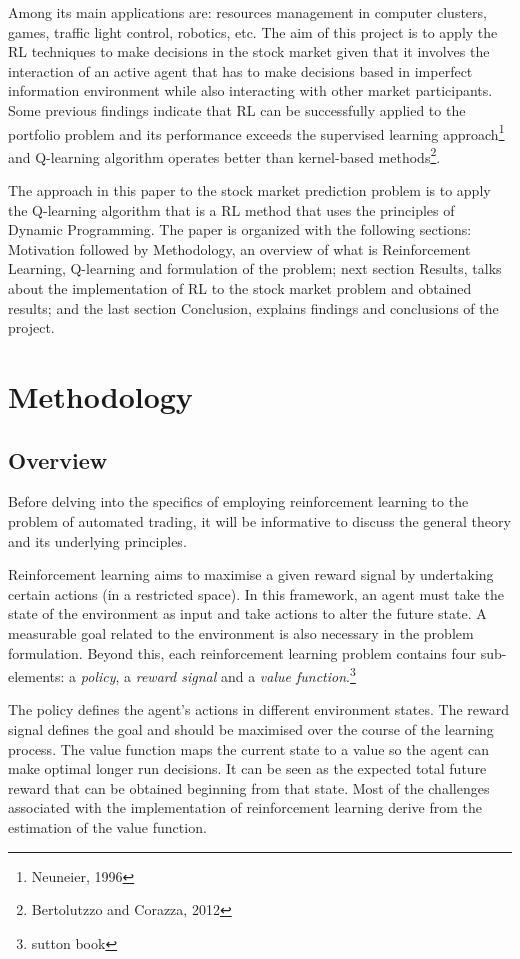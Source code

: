 \documentclass[12pt, authoryear]{elsarticle}
\begin{document}
Among its main applications are: resources management in computer clusters, games, traffic light control, robotics, etc. The aim of this project is to apply the RL techniques to make decisions in the stock market given that it involves the interaction of an active agent that has to make decisions based in imperfect information environment while also interacting with other market participants. Some previous findings indicate that RL can be successfully applied to the portfolio problem and its performance exceeds the supervised learning approach\footnote{Neuneier, 1996} and Q-learning algorithm operates better than kernel-based methods\footnote{Bertolutzzo and Corazza, 2012}.

The approach in this paper to the stock market prediction problem is to apply the Q-learning algorithm that is a RL method that uses the principles of Dynamic Programming. The paper is organized with the following sections: Motivation followed by Methodology, an overview of what is Reinforcement Learning, Q-learning and formulation of the problem; next section Results, talks about the implementation of RL to the stock market problem and obtained results; and the last section Conclusion, explains findings and conclusions of the project.  



\section{Methodology}
\subsection{Overview}
Before delving into the specifics of employing reinforcement learning to the problem of automated trading, it will be informative to discuss the general theory and its underlying principles. 

Reinforcement learning aims to maximise a given reward signal by undertaking certain actions (in a restricted space). In this framework, an agent must take the state of the environment as input and take actions to alter the future state. A measurable goal related to the environment is also necessary in the problem formulation. Beyond this, each reinforcement learning problem contains four sub-elements: a \textit{policy}, a \textit{reward signal} and a \textit{value function}.\footnote{sutton book }

The policy defines the agent's actions in different environment states. The reward signal defines the goal and should be maximised over the course of the learning process. The value function maps the current state to a value so the agent can make optimal longer run decisions. It can be seen as the expected total future reward that can be obtained beginning from that state. Most of the challenges associated with the implementation of reinforcement learning derive from the estimation of the value function.
\end{document}
